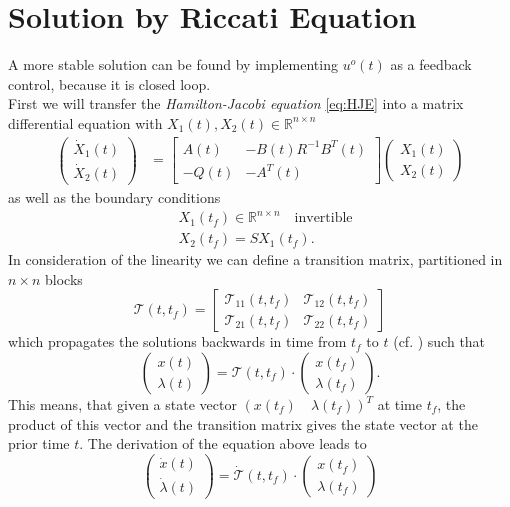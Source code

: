 \documentclass[paper=a4, pagesize, DIV=calc, BCOR=12.5mm, twoside=on, onecolumn=on, open = any, titlepage =on, parskip =half-, headsepline = on, footsepline = on, chapterprefix = on, appendixprefix = off, fontsize = 12pt, numbers = noenddot, abstract = on]{scrbook}
\numberwithin{equation}{chapter}
\theoremstyle{definition}
\theoremstyle{plain}
\theoremstyle{plain}
\theoremstyle{remark}
\theoremstyle{plain}
\theoremstyle{plain}
\begin{document}
\section{Solution by Riccati Equation}
\onehalfspacing
A more stable solution can be found by implementing $u^o(t)$ as a feedback control, because it is closed loop.\\
First we will transfer the \emph{Hamilton-Jacobi equation} \eqref{eq:HJE} into a matrix differential equation with $X_1(t), X_2(t) \in \mathbb{R}^{n \times n}$
\renewcommand\arraystretch{1}
\begin{align}
\begin{pmatrix}
\dot{X}_1(t)\\
\dot{X}_2(t)
\end{pmatrix} &= 
\begin{bmatrix}
A(t) & -B(t)R^{-1}B^T(t)\\
-Q(t) & -A^T(t)
\end{bmatrix}
\begin{pmatrix}
X_1(t)\\
X_2(t)
\end{pmatrix}
\end{align}
as well as the boundary conditions
\begin{align*}
& X_1(t_f) \in \mathbb{R}^{n \times n} \quad \text{invertible}\\
& X_2(t_f) = SX_1(t_f).
\end{align*}
In consideration of the linearity we can define a transition matrix, partitioned in $n \times n$ blocks \[\mathcal{T}(t, t_f) = \begin{bmatrix}
\mathcal{T}_{11}(t, t_f) &\mathcal{T}_{12}(t, t_f)\\
\mathcal{T}_{21}(t, t_f) & \mathcal{T}_{22}(t, t_f)
\end{bmatrix}\]
which propagates the solutions backwards in time from $t_f$ to $t$ (cf. \cite{lib:2012}) such that 
\[
\begin{pmatrix}
x(t)\\
\lambda(t)
\end{pmatrix}
 = \mathcal{T}(t, t_f) \cdot \begin{pmatrix}
 x(t_f)\\
 \lambda(t_f)
 \end{pmatrix}.
\]
This means, that given a state vector $(x(t_f) \quad \lambda (t_f))^T$ at time $t_f$, the product of this vector and the transition matrix gives the state vector at the prior time $t$.
The derivation of the equation above leads to
\[
\begin{pmatrix}
\dot{x}(t)\\
\dot{\lambda}(t)
\end{pmatrix}
 = \dot{\mathcal{T}}(t, t_f) \cdot 
 \begin{pmatrix}
 x(t_f)\\
 \lambda(t_f)
 \end{pmatrix}
\]
\end{document}

